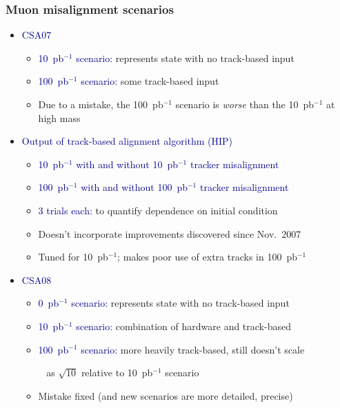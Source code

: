 \documentclass[compress]{beamer}
\begin{document}
\begin{frame}
\frametitle{Muon misalignment scenarios}

\begin{itemize}
\item \textcolor{darkblue}{CSA07}
\begin{itemize}
\item \textcolor{darkblue}{10~pb$^{-1}$ scenario:} represents state with no track-based input
\item \textcolor{darkblue}{100~pb$^{-1}$ scenario:} some track-based input
\item Due to a mistake, the 100~pb$^{-1}$ scenario is {\it worse} than the 10~pb$^{-1}$ at high mass
\end{itemize}

\item \textcolor{darkblue}{Output of track-based alignment algorithm (HIP)}

\begin{itemize}
\item \textcolor{darkblue}{10~pb$^{-1}$ with and without 10~pb$^{-1}$ tracker misalignment}

\item \textcolor{darkblue}{100~pb$^{-1}$ with and without 100~pb$^{-1}$ tracker misalignment}

\item \textcolor{darkblue}{3 trials each:} to quantify dependence on initial condition

\item Doesn't incorporate improvements discovered since Nov.\ 2007

\item Tuned for 10~pb$^{-1}$; makes poor use of extra tracks in 100~pb$^{-1}$
\end{itemize}

\item \textcolor{darkblue}{CSA08}
\begin{itemize}
\item \textcolor{darkblue}{0~pb$^{-1}$ scenario:} represents state with no track-based input
\item \textcolor{darkblue}{10~pb$^{-1}$ scenario:} combination of hardware and track-based
\item \textcolor{darkblue}{100~pb$^{-1}$ scenario:} more heavily track-based, still doesn't scale

\mbox{ } \hfill as $\sqrt{10}$ relative to 10~pb$^{-1}$ scenario
\item Mistake fixed (and new scenarios are more detailed, precise)
\end{itemize}
\end{itemize}
\end{frame}
\end{document}
